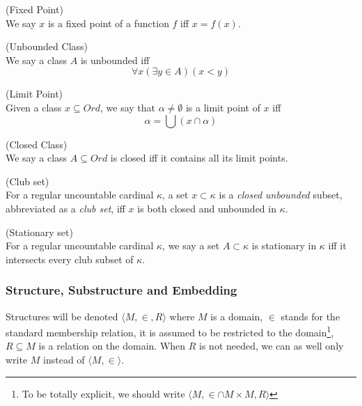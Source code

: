 \begin{definition}{(Fixed Point)}\label{def:fixed_point}\\
We say $x$ is a fixed point of a function $f$ iff $x=f(x)$.
\end{definition}

\begin{definition}{(Unbounded Class)}\label{def:unbounded_class}\\
We say a class $A$ is unbounded iff
\begin{equation}
\forall x (\exists y \in A) (x < y)
\end{equation}
\end{definition}

\begin{definition}{(Limit Point)}\label{def:limit_point}\\
Given a class $x \subseteq Ord$, we say that $\alpha \neq \emptyset$ is a limit point of $x$ iff 
\begin{equation}
\alpha = \bigcup(x \cap \alpha)
\end{equation}
\end{definition}

\begin{definition}{(Closed Class)}\label{def:closed_class}\\
We say a class $A \subseteq Ord$ is closed iff it contains all its limit points.
\end{definition}

\begin{definition}{(Club set)}\label{def:club_set}\\
For a regular uncountable cardinal $\kappa$, a set $x \subset \kappa$ is a \emph{closed unbounded} subset, abbreviated as a \emph{club set}, iff $x$ is both closed and unbounded in $\kappa$.
\end{definition}

\begin{definition}{(Stationary set)}\label{def:stationary_set}\\
For a regular uncountable cardinal $\kappa$, we say a set $A \subset \kappa$ is stationary in $\kappa$ iff it intersects every club subset of $\kappa$.
\end{definition}

\subsubsection{Structure, Substructure and Embedding}

Structures will be denoted $\langle M, \in, R \rangle$ where $M$ is a domain, $\in$ stands for the standard membership relation, it is assumed to be restricted to the domain\footnote{To be totally explicit, we should write $\langle M, \in \cap M \times M, R \rangle$}, $R \subseteq M$ is a relation on the domain. When $R$ is not needed, we can as well only write $M$ instead of $\langle M, \in \rangle$.

